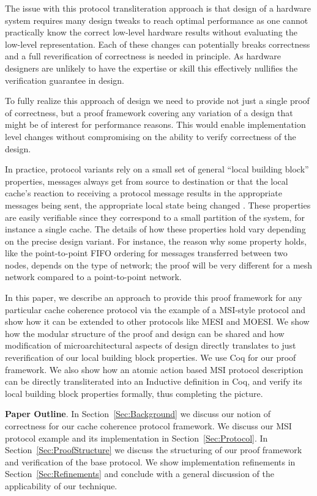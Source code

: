 The issue with this protocol transliteration approach is that design
of a hardware system requires many design tweaks to reach optimal
performance as one cannot practically know the correct low-level
hardware results without evaluating the low-level representation.
Each of these changes can potentially breaks correctness and a full
reverification of correctness is needed in principle. As hardware
designers are unlikely to have the expertise or skill this effectively
nullifies the verification guarantee in design.

To fully realize this approach of design we need to provide not just a
single proof of correctness, but a proof framework covering any
variation of a design that might be of interest for performance
reasons. This would enable implementation level changes without
compromising on the ability to verify correctness of the design.

In practice, protocol variants rely on a small set of general ``local
building block'' properties, \eg{} messages always get from source to
destination or that the local cache's reaction to receiving a protocol
message results in the appropriate messages being sent, the
appropriate local state being changed \etc{}.  These properties are
easily verifiable since they correspond to a small partition of the
system, for instance a single cache.  The details of how these
properties hold vary depending on the precise design variant. For
instance, the reason why some property holds, like the point-to-point
FIFO ordering for messages transferred between two nodes, depends on
the type of network; the proof will be very different for a mesh
network compared to a point-to-point network.

In this paper, we describe an approach to provide this proof framework
for any particular cache coherence protocol via the example of a
MSI-style protocol and show how it can be extended to other protocols
like MESI and MOESI. We show how the modular structure of the proof
and design can be shared and how modification of microarchitectural
aspects of design directly translates to just reverification of our
local building block properties. We use Coq for our proof
framework. We also show how an atomic action based MSI protocol
description can be directly transliterated into an Inductive
definition in Coq, and verify its local building block properties
formally, thus completing the picture.

\noindent\textbf{Paper Outline}. In Section~\ref{Sec:Background} we
discuss our notion of correctness for our cache coherence protocol
framework. We discuss our MSI protocol example and its implementation
in Section~\ref{Sec:Protocol}. In Section~\ref{Sec:ProofStructure} we discuss
the structuring of our proof framework and verification of the base
protocol. We show implementation refinements in
Section~\ref{Sec:Refinements} and conclude with a general discussion
of the applicability of our technique.
